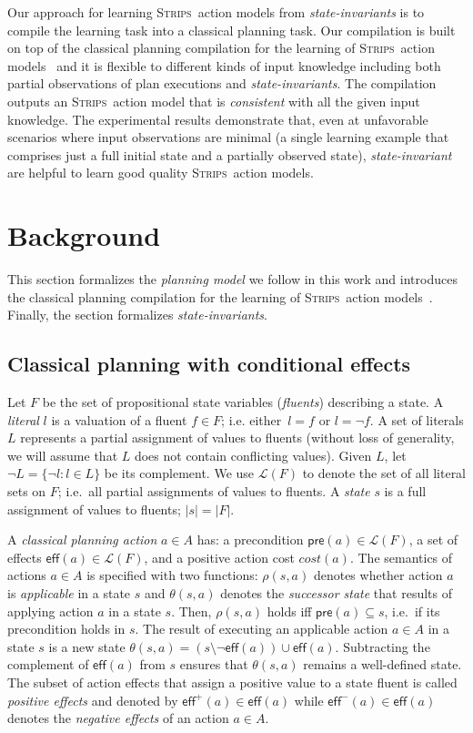 \documentclass{article}
\newcommand{\pre}{\mathsf{pre}}     %
\newcommand{\eff}{\mathsf{eff}}     %
\newcommand{\strips}{\textsc{Strips}}
\begin{document}
Our approach for learning \strips\ action models from {\em state-invariants} is to compile the learning task into a classical planning task. Our compilation is built on top of the classical planning compilation for the learning of \strips\ action models~\cite{aineto2018learning} and it is flexible to different kinds of input knowledge including both partial observations of plan executions and {\em state-invariants}. The compilation outputs an \strips\ action model that is {\em consistent} with all the given input knowledge. The experimental results demonstrate that, even at unfavorable scenarios where input observations are minimal (a single learning example that comprises just a full initial state and a partially observed state), {\em state-invariant} are helpful to learn good quality \strips\ action models.



\section{Background}
\label{sec:background}
This section formalizes the {\em planning model} we follow in this work and introduces the classical planning compilation for the learning of \strips\ action models~\cite{aineto2018learning}. Finally, the section formalizes {\em state-invariants}.

\subsection{Classical planning with conditional effects}
Let $F$ be the set of  propositional state variables ({\em fluents}) describing a state. A {\em literal} $l$ is a valuation of a fluent $f\in F$; i.e. either~$l=f$ or $l=\neg f$. A set of literals $L$ represents a partial assignment of values to fluents (without loss of generality, we will assume that $L$ does not contain conflicting values). Given $L$, let $\neg L=\{\neg l:l\in L\}$ be its complement. We use $\mathcal{L}(F)$ to denote the set of all literal sets on $F$; i.e.~all partial assignments of values to fluents. A {\em state} $s$ is a full assignment of values to fluents; $|s|=|F|$.

A {\em classical planning action} $a\in A$ has: a precondition $\pre(a)\in\mathcal{L}(F)$, a set of effects $\eff(a)\in\mathcal{L}(F)$, and a positive action cost $cost(a)$. The semantics of actions $a\in A$ is specified with two functions: $\rho(s,a)$ denotes whether action $a$ is {\em applicable} in a state $s$ and $\theta(s,a)$ denotes the {\em successor state} that results of applying action $a$ in a state $s$. Then, $\rho(s,a)$ holds iff $\pre(a)\subseteq s$, i.e.~if its precondition holds in $s$. The result of executing an applicable action $a\in A$ in a state $s$ is a new state $\theta(s,a)=(s\setminus \neg\eff(a))\cup\eff(a)$. Subtracting the complement of $\eff(a)$ from $s$ ensures that $\theta(s,a)$ remains a well-defined state. The subset of action effects that assign a positive value to a state fluent is called {\em positive effects} and denoted by $\eff^+(a)\in \eff(a)$ while $\eff^-(a)\in \eff(a)$ denotes the {\em negative effects} of an action $a\in A$.
\end{document}
